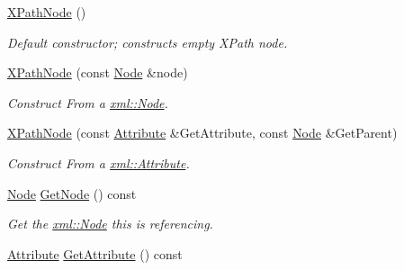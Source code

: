 \begin{DoxyCompactItemize}
\item 
\hypertarget{classphys_1_1xml_1_1XPathNode_a5e4ac19a93960347f4ce9dc05c88e26d}{
\hyperlink{classphys_1_1xml_1_1XPathNode_a5e4ac19a93960347f4ce9dc05c88e26d}{XPathNode} ()}
\label{classphys_1_1xml_1_1XPathNode_a5e4ac19a93960347f4ce9dc05c88e26d}

\begin{DoxyCompactList}\small\item\em Default constructor; constructs empty XPath node. \item\end{DoxyCompactList}\item 
\hyperlink{classphys_1_1xml_1_1XPathNode_ab70dcfefef2107eca2d1932faada475e}{XPathNode} (const \hyperlink{classphys_1_1xml_1_1Node}{Node} \&node)
\begin{DoxyCompactList}\small\item\em Construct From a \hyperlink{classphys_1_1xml_1_1Node}{xml::Node}. \item\end{DoxyCompactList}\item 
\hyperlink{classphys_1_1xml_1_1XPathNode_a3f9446596022b6e0ab77afc2748c98e0}{XPathNode} (const \hyperlink{classphys_1_1xml_1_1Attribute}{Attribute} \&GetAttribute, const \hyperlink{classphys_1_1xml_1_1Node}{Node} \&GetParent)
\begin{DoxyCompactList}\small\item\em Construct From a \hyperlink{classphys_1_1xml_1_1Attribute}{xml::Attribute}. \item\end{DoxyCompactList}\item 
\hyperlink{classphys_1_1xml_1_1Node}{Node} \hyperlink{classphys_1_1xml_1_1XPathNode_ad34ea7db6cabdfe92656b7d033dbbf35}{GetNode} () const 
\begin{DoxyCompactList}\small\item\em Get the \hyperlink{classphys_1_1xml_1_1Node}{xml::Node} this is referencing. \item\end{DoxyCompactList}\item 
\hypertarget{classphys_1_1xml_1_1XPathNode_a258785388868adf9fa53437cac7cd41c}{
\hyperlink{classphys_1_1xml_1_1Attribute}{Attribute} \hyperlink{classphys_1_1xml_1_1XPathNode_a258785388868adf9fa53437cac7cd41c}{GetAttribute} () const }
\label{classphys_1_1xml_1_1XPathNode_a258785388868adf9fa53437cac7cd41c}


\end{DoxyCompactItemize}
